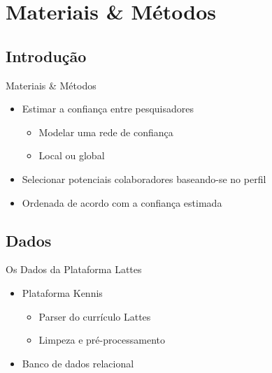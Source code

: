 \documentclass{beamer}
\begin{document}
\section{Materiais \& Métodos}

\subsection{Introdução}

\begin{frame}{Materiais \& Métodos}{}

  \begin{itemize}
    \item Estimar a confiança entre pesquisadores
    \begin{itemize}
      \item Modelar uma rede de confiança
      \item Local ou global
    \end{itemize}
    \item Selecionar potenciais colaboradores baseando-se no perfil
    \item Ordenada de acordo com a confiança estimada
  \end{itemize}
\end{frame}

\subsection{Dados}

\begin{frame}{Os Dados da Plataforma Lattes}{}

  \begin{itemize}
    \item Plataforma Kennis
    \begin{itemize}
      \item Parser do currículo Lattes
      \item Limpeza e pré-processamento
    \end{itemize}
    \item Banco de dados relacional
  \end{itemize}

\end{frame}
\end{document}
